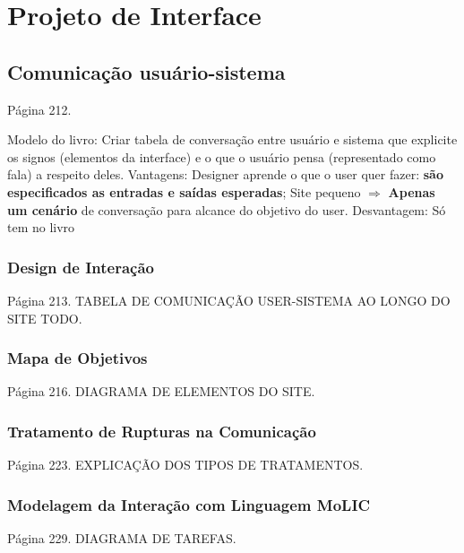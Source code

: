 \chapter{Projeto de Interface}


\section{Comunicação usuário-sistema}

\indent Página 212.

\indent Modelo do livro: Criar tabela de conversação entre usuário e sistema que explicite os signos (elementos da interface) e o que o usuário pensa (representado como fala) a respeito deles. Vantagens: Designer aprende o que o user quer fazer: \textbf{são especificados as entradas e saídas esperadas}; Site pequeno $\Rightarrow$ \textbf{Apenas um cenário} de conversação para alcance do objetivo do user. Desvantagem: Só tem no livro

\subsection{Design de Interação}

\indent Página 213. TABELA DE COMUNICAÇÃO USER-SISTEMA AO LONGO DO SITE TODO.

\subsection{Mapa de Objetivos}

\indent Página 216. DIAGRAMA DE ELEMENTOS DO SITE.

\subsection{Tratamento de Rupturas na Comunicação}

\indent Página 223. EXPLICAÇÃO DOS TIPOS DE TRATAMENTOS.

\subsection{Modelagem da Interação com Linguagem MoLIC}

\indent Página 229. DIAGRAMA DE TAREFAS.


